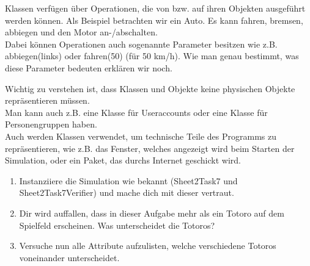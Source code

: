 \begin{Infobox}
    Klassen verfügen über Operationen, die von bzw. auf ihren Objekten ausgeführt werden können.
Als Beispiel betrachten wir ein Auto. Es kann fahren, bremsen, abbiegen und den Motor an-/abschalten.\\

Dabei können Operationen auch sogenannte Parameter besitzen wie z.B. abbiegen(links) oder fahren(50) (für 50 km/h).
Wie man genau bestimmt, was diese Parameter bedeuten erklären wir noch.
\end{Infobox}

\begin{Infobox}
Wichtig zu verstehen ist, dass Klassen und Objekte keine physischen Objekte repräsentieren müssen.\\
Man kann auch z.B. eine Klasse für Useraccounts oder eine Klasse für Personengruppen haben.\\
Auch werden Klassen verwendet, um technische Teile des Programms zu repräsentieren, wie z.B. das Fenster, welches angezeigt wird beim Starten der Simulation, oder ein Paket, das durchs Internet geschickt wird.
\end{Infobox}

\begin{enumerate}
\item Instanziiere die Simulation wie bekannt (Sheet2Task7 und Sheet2Task7Verifier) und mache dich mit dieser vertraut.
\item Dir wird auffallen, dass in dieser Aufgabe mehr als ein Totoro auf dem Spielfeld erscheinen.
 Was unterscheidet die Totoros?
\item Versuche nun alle Attribute aufzulisten, welche verschiedene Totoros voneinander unterscheidet.
\end{enumerate}
